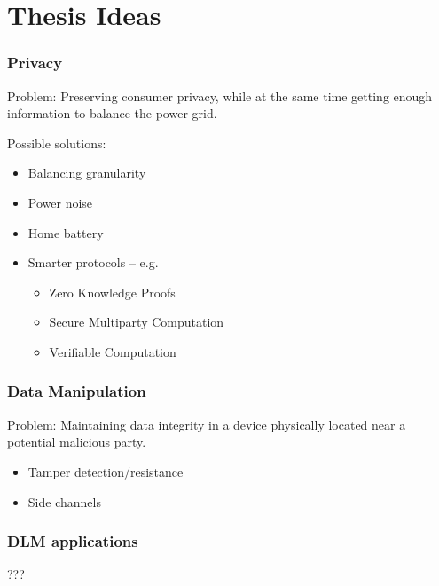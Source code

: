 
\section{Thesis Ideas}

\begin{frame}
  \frametitle{Privacy}

  Problem: Preserving consumer privacy, while at the same time getting enough information to balance the power grid.

  Possible solutions:
  \begin{itemize}
    \item Balancing granularity
    \item Power noise
    \item Home battery
    \item Smarter protocols -- e.g.
    \begin{itemize}
      \item Zero Knowledge Proofs
      \item Secure Multiparty Computation
      \item Verifiable Computation
    \end{itemize}
  \end{itemize}
\end{frame}

\begin{frame}
  \frametitle{Data Manipulation}

  Problem: Maintaining data integrity in a device physically located near a potential malicious party.

  \begin{itemize}
    \item Tamper detection/resistance
    \item Side channels
  \end{itemize}
\end{frame}

\begin{frame}
  \frametitle{DLM applications}

  ???
\end{frame}
